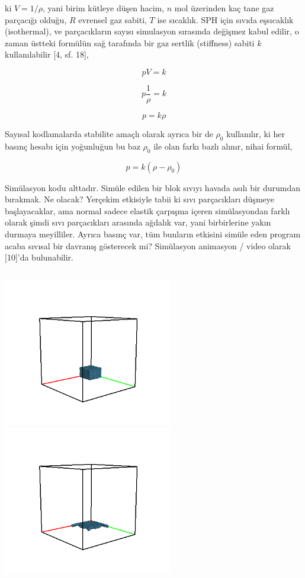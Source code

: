 \documentclass[12pt,fleqn]{article}\usepackage{../../common}
\begin{document}
ki $V = 1 / \rho$, yani birim kütleye düşen hacim, $n$ mol üzerinden kaç tane
gaz parçacığı olduğu, $R$ evrensel gaz sabiti, $T$ ise sıcaklık. SPH için sıvıda
eşsıcaklık (isothermal), ve parçacıkların sayısı simulasyon sırasında değişmez
kabul edilir, o zaman üstteki formülün sağ tarafında bir gaz sertlik (stiffness)
sabiti $k$ kullanılabilir [4, sf. 18], 

$$
p V = k
$$

$$
p \frac{1}{\rho} = k
$$

$$
p  = k \rho
$$

Sayısal kodlamalarda stabilite amaçlı olarak ayrıca bir de $\rho_0$ kullanılır,
ki her basınç hesabı için yoğunluğun bu baz $\rho_0$ ile olan farkı bazlı
alınır, nihai formül,

$$
p  = k (\rho - \rho_0)
$$

Simülasyon kodu alttadır. Simüle edilen bir blok sıvıyı havada asılı bir
durumdan bırakmak. Ne olacak? Yerçekim etkisiyle tabii ki sıvı parçacıkları
düşmeye başlayacaklar, ama normal sadece elastik çarpışma içeren simülasyondan
farklı olarak şimdi sıvı parçacıkları arasında ağdalık var, yani birbirlerine
yakın durmaya meyilliler. Ayrıca basınç var, tüm bunların etkisini simüle eden
program acaba sıvısal bir davranış gösterecek mi? Simülasyon animasyon / video
olarak [10]'da bulunabilir.

\inputminted[fontsize=\footnotesize]{python}{simsph.py}

\includegraphics[width=20em]{glutout-002.png}
\includegraphics[width=20em]{glutout-004.png}
\end{document}
